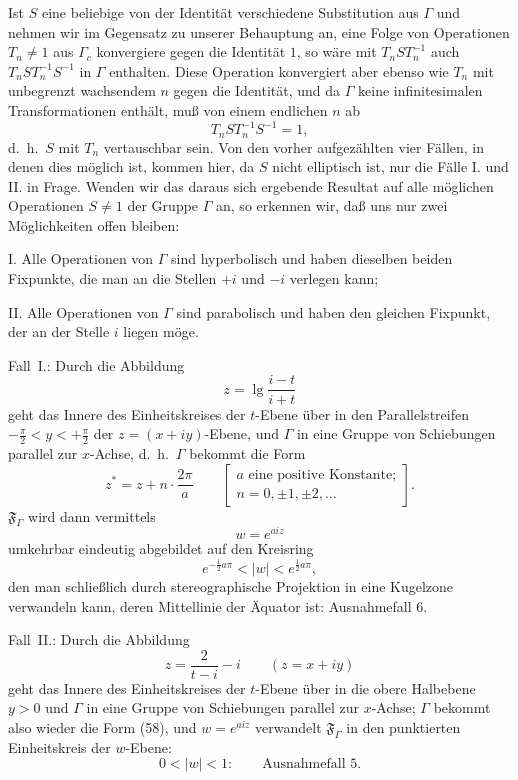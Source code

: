\documentclass{article}
\begin{document}
Ist $S$ eine beliebige von der Identität verschiedene Substitution aus $\varGamma$ und nehmen wir im Gegensatz zu unserer Behauptung an, eine Folge von Operationen $T_n \neq 1$ aus $\varGamma_c$ konvergiere gegen die Identität $1$, so wäre mit $T_n S T_n^{-1}$ auch $T_n S T_n^{-1} S^{-1}$ in $\varGamma$ enthalten. Diese Operation konvergiert aber ebenso wie $T_n$ mit unbegrenzt wachsendem $n$ gegen die Identität, und da $\varGamma$ keine infinitesimalen Transformationen enthält, muß von einem endlichen $n$ ab
\[ T_n S T_n^{-1} S^{-1} = 1, \]
d.~h.\ $S$ mit $T_n$ vertauschbar sein. Von den vorher aufgezählten vier Fällen, in denen dies möglich ist, kommen hier, da $S$ nicht elliptisch ist, nur die Fälle I. und II. in Frage. Wenden wir das daraus sich ergebende Resultat auf alle möglichen Operationen $S \neq 1$ der Gruppe $\varGamma$ an, so erkennen wir, daß uns nur zwei Möglichkeiten offen bleiben:

I. Alle Operationen von $\varGamma$ sind hyperbolisch und haben dieselben beiden Fixpunkte, die man an die Stellen $+i$ und $-i$ verlegen kann;

II. Alle Operationen von $\varGamma$ sind parabolisch und haben den gleichen Fixpunkt, der an der Stelle $i$ liegen möge.

Fall~I.: Durch die Abbildung
\[ z = \lg \frac{i - t}{i + t} \]
geht das Innere des Einheitskreises der $t$-Ebene über in den Parallelstreifen $-\frac{\pi}{2} < y < +\frac{\pi}{2}$ der $z = (x + iy)$-Ebene, und $\varGamma$ in eine Gruppe von Schiebungen parallel zur $x$-Achse, d.~h.\ $\varGamma$ bekommt die Form
\[ z^* = z + n \cdot \frac{2\pi}{a} \qquad \begin{bmatrix} a \text{ eine positive Konstante;} \\ n = 0, \pm 1, \pm 2, \dots \end{bmatrix}. \tag{58} \]
$\mathfrak{F}_\varGamma$ wird dann vermittels
\[ w = e^{aiz} \]
umkehrbar eindeutig abgebildet auf den Kreisring
\[ e^{-\frac{1}{2}a\pi} < |w| < e^{\frac{1}{2}a\pi}, \]
den man schließlich durch stereographische Projektion in eine Kugelzone verwandeln kann, deren Mittellinie der Äquator ist: Ausnahmefall 6.

Fall~II.: Durch die Abbildung
\[ z = \frac{2}{t - i} - i \qquad (z = x + iy) \]
geht das Innere des Einheitskreises der $t$-Ebene über in die obere Halbebene $y > 0$ und $\varGamma$ in eine Gruppe von Schiebungen parallel zur $x$-Achse; $\varGamma$ bekommt also wieder die Form (58), und $w = e^{aiz}$ verwandelt $\mathfrak{F}_\varGamma$ in den punktierten Einheitskreis der $w$-Ebene:
\[ 0 < |w| < 1\colon \qquad \text{Ausnahmefall 5.} \]
\end{document}
